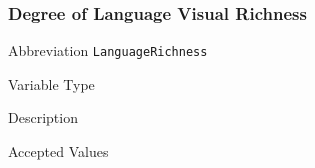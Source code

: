 \subsubsection{Degree of Language Visual Richness}
\label{subsec:languagerichness}

\begin{AlignedDesc}
  \item[Abbreviation] \texttt{LanguageRichness}

  \item[Variable Type]

  \item[Description]

  \item[Accepted Values]

  \begin{AlignedDesc}
    \item[\textellipsis]
  \end{AlignedDesc}

\end{AlignedDesc}


